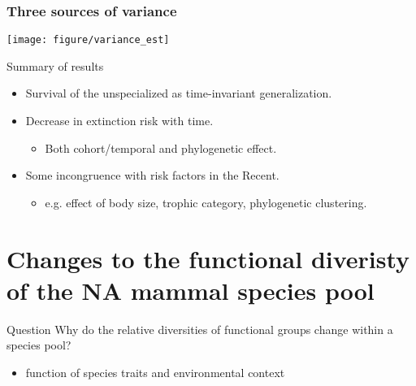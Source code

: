 \documentclass{beamer}
\begin{document}
\begin{frame}
  \frametitle{Three sources of variance}

  \begin{center}
    \texttt{[image: figure/variance\_est]}
  \end{center}

  \tiny{}
\end{frame}

\begin{frame}
  \begin{block}{Summary of results}
    \begin{itemize}
      \item Survival of the unspecialized as time-invariant generalization.
      \item Decrease in extinction risk with time.
        \begin{itemize}
          \item Both cohort/temporal and phylogenetic effect.
        \end{itemize}
      \item Some incongruence with risk factors in the Recent.
        \begin{itemize}
          \item e.g. effect of body size, trophic category, phylogenetic clustering.
        \end{itemize}
    \end{itemize}
  \end{block}
\end{frame}



\section{Changes to the functional diveristy of the NA mammal species pool}

\begin{frame}
  \begin{alertblock}{Question}
    \alert{Why} do the relative diversities of functional groups change within a species pool?
    \begin{itemize}
      \item function of \alert{species traits} and \alert{environmental context}
    \end{itemize}
  \end{alertblock}
\end{frame}
\end{document}
